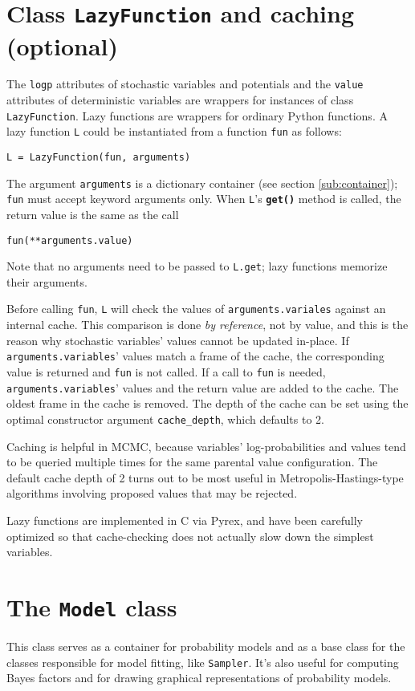 \section{Class \texttt{LazyFunction} and caching (optional)}

The \texttt{logp} attributes of stochastic variables and potentials and the \texttt{value} attributes of deterministic variables are wrappers for instances of class \texttt{LazyFunction}. Lazy functions are wrappers for ordinary Python functions. A lazy function \texttt{L} could be instantiated from a function \texttt{fun} as follows:
\begin{verbatim}
L = LazyFunction(fun, arguments)
\end{verbatim}
The argument \texttt{arguments} is a dictionary container (see section \ref{sub:container}); \texttt{fun} must accept keyword arguments only. When \texttt{L}'s \texttt{\bfseries get()} method is called, the return value is the same as the call 
\begin{verbatim}
fun(**arguments.value)
\end{verbatim}
Note that no arguments need to be passed to \texttt{L.get}; lazy functions memorize their arguments.

Before calling \texttt{fun}, \texttt{L} will check the values of \texttt{arguments.variales} against an internal cache. This comparison is done \emph{by reference}, not by value, and this is the reason why stochastic variables' values cannot be updated in-place. If \texttt{arguments.variables}' values match a frame of the cache, the corresponding value is returned and \texttt{fun} is not called. If a call to \texttt{fun} is needed, \texttt{arguments.variables}' values and the return value are added to the cache. The oldest frame in the cache is removed. The depth of the cache can be set using the optimal constructor argument \texttt{cache\_depth}, which defaults to 2.

Caching is helpful in MCMC, because variables' log-probabilities and values tend to be queried multiple times for the same parental value configuration. The default cache depth of 2 turns out to be most useful in Metropolis-Hastings-type algorithms involving proposed values that may be rejected.

Lazy functions are implemented in C via Pyrex, and have been carefully optimized so that cache-checking does not actually slow down the simplest variables.


\section{The \texttt{Model} class} \label{sec:Model}
This class serves as a container for probability models and as a base class for the classes responsible for model fitting, like \texttt{Sampler}. It's also useful for computing Bayes factors and for drawing graphical representations of probability models.

